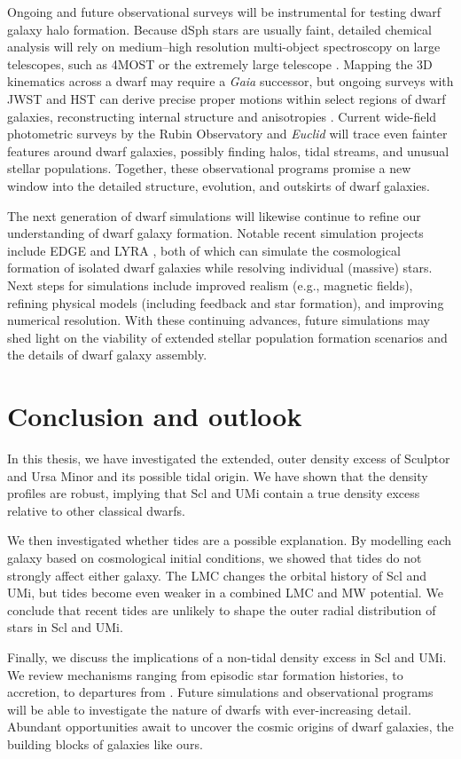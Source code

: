 Ongoing and future observational surveys will be instrumental for
testing dwarf galaxy halo formation. Because dSph stars are usually
faint, detailed chemical analysis will rely on medium--high resolution
multi-object spectroscopy on large telescopes, such as 4MOST
\citep{skuladottir+2023} or the extremely large telescope
\citep{jagourel+2018}. Mapping the 3D kinematics across a dwarf may
require a \emph{Gaia} successor, but ongoing surveys with JWST and HST
can derive precise proper motions within select regions of dwarf
galaxies, reconstructing internal structure and anisotropies
\citep[e.g.,][]{vitral+2025}. Current wide-field photometric surveys by
the Rubin Observatory \citep{ivezic+2019} and \emph{Euclid}
\citep{euclidcollaboration+2025} will trace even fainter features around
dwarf galaxies, possibly finding halos, tidal streams, and unusual
stellar populations. Together, these observational programs promise a
new window into the detailed structure, evolution, and outskirts of
dwarf galaxies.

The next generation of dwarf simulations will likewise continue to
refine our understanding of dwarf galaxy formation. Notable recent
simulation projects include EDGE \citep{agertz+2020} and LYRA
\citep{gutcke+2021}, both of which can simulate the cosmological
formation of isolated dwarf galaxies while resolving individual
(massive) stars. Next steps for simulations include improved realism
(e.g., magnetic fields), refining physical models (including feedback
and star formation), and improving numerical resolution. With these
continuing advances, future simulations may shed light on the viability
of extended stellar population formation scenarios and the details of
dwarf galaxy assembly.

\section{Conclusion and outlook}\label{conclusion-and-outlook}

In this thesis, we have investigated the extended, outer density excess
of Sculptor and Ursa Minor and its possible tidal origin. We have shown
that the density profiles are robust, implying that Scl and UMi contain
a true density excess relative to other classical dwarfs.

We then investigated whether tides are a possible explanation. By
modelling each galaxy based on cosmological initial conditions, we
showed that tides do not strongly affect either galaxy. The LMC changes
the orbital history of Scl and UMi, but tides become even weaker in a
combined LMC and MW potential. We conclude that recent tides are
unlikely to shape the outer radial distribution of stars in Scl and UMi.

Finally, we discuss the implications of a non-tidal density excess in
Scl and UMi. We review mechanisms ranging from episodic star formation
histories, to accretion, to departures from \LCDM{}. Future simulations
and observational programs will be able to investigate the nature of
dwarfs with ever-increasing detail. Abundant opportunities await to
uncover the cosmic origins of dwarf galaxies, the building blocks of
galaxies like ours.
